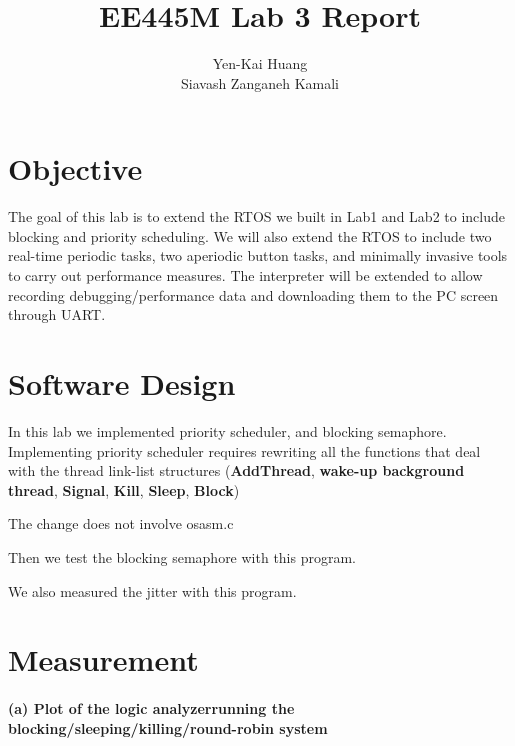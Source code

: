 \documentclass[a4paper]{article}
\begin{document}
\title{EE445M Lab 3 Report}
\author{Yen-Kai Huang \\ Siavash Zanganeh Kamali}
\maketitle

\section{Objective} The goal of this lab is to extend the RTOS we built in Lab1 and Lab2 to include blocking and priority scheduling. We will also extend the RTOS to include two real-time periodic tasks, two aperiodic button tasks, and minimally invasive tools to carry out performance measures. The interpreter will be extended to allow recording debugging/performance data and downloading them to the PC screen through UART. 

\section{Software Design}
In this lab we implemented priority scheduler, and blocking semaphore. Implementing priority scheduler requires
rewriting all the functions that deal with the thread link-list structures (\textbf{AddThread}, \textbf{wake-up
background thread}, \textbf{Signal}, \textbf{Kill}, \textbf{Sleep}, \textbf{Block})

\lstset{language=C, style=MyCStyle}


The change does not involve osasm.c

\lstset{language=C, style=MyASMStyle}


Then we test the blocking semaphore with this program.

\lstset{language=C, style=MyCStyle}


We also measured the jitter with this program.

\lstset{language=C, style=MyCStyle}


\section{Measurement}

\paragraph{(a) Plot of the logic analyzerrunning the blocking/sleeping/killing/round-robin system\\}
\end{document}
